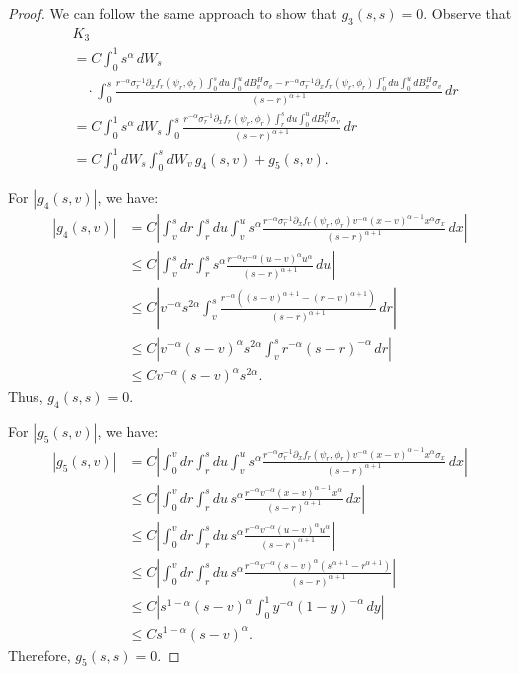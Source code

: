 \documentclass{article}
\theoremstyle{definition}  %
\theoremstyle{plain}  %
\begin{document}
\begin{proof}
We can follow the same approach to show that \( g_3(s, s) = 0 \). Observe that
\begin{align*}
    &K_3 \\
    &= C \int_0^1 s^\alpha \, dW_s\\
&\quad\cdot\int_0^s \frac{r^{-\alpha} \sigma_r^{-1} \partial_x f_r(\psi_r, \phi_r) \int_0^s du \int_0^u dB^H_v \sigma_v - r^{-\alpha} \sigma_r^{-1} \partial_x f_r(\psi_r, \phi_r) \int_0^r du \int_0^u dB^H_v \sigma_v}{(s - r)^{\alpha + 1}} \, dr \\
    &= C \int_0^1 s^\alpha \, dW_s \int_0^s \frac{r^{-\alpha} \sigma_r^{-1} \partial_x f_r(\psi_r, \phi_r) \int_r^s du \int_0^u dB^H_v \sigma_v}{(s - r)^{\alpha + 1}} \, dr \\
    &= C \int_0^1 dW_s \int_0^s dW_v \, g_4(s,v) + g_5(s,v).
\end{align*}

For \( |g_4(s,v)| \), we have:
\begin{align*}
    |g_4(s,v)| &= C \left| \int_v^s dr \int_r^s du \int_v^u s^\alpha \frac{r^{-\alpha} \sigma_r^{-1} \partial_x f_r(\psi_r, \phi_r) v^{-\alpha} (x - v)^{\alpha - 1} x^\alpha \sigma_x}{(s - r)^{\alpha + 1}} \, dx \right| \\
    &\leq C \left| \int_v^s dr \int_r^s s^\alpha \frac{r^{-\alpha} v^{-\alpha} (u - v)^{\alpha} u^\alpha}{(s - r)^{\alpha + 1}} \, du \right| \\
    &\leq C \left| v^{-\alpha} s^{2\alpha} \int_v^s \frac{r^{-\alpha} \left( (s - v)^{\alpha + 1} - (r - v)^{\alpha + 1} \right)}{(s - r)^{\alpha + 1}} \, dr \right| \\
    &\leq C \left| v^{-\alpha} (s - v)^{\alpha} s^{2\alpha} \int_v^s r^{-\alpha} (s - r)^{-\alpha} \, dr \right| \\
    &\leq C v^{-\alpha} (s - v)^\alpha s^{2\alpha}.
\end{align*}
Thus, \( g_4(s,s) = 0 \).

For \( |g_5(s,v)| \), we have:
\begin{align*}
    |g_5(s,v)| &= C \left| \int_0^v dr \int_r^s du \int_v^u s^\alpha \frac{r^{-\alpha} \sigma_r^{-1} \partial_x f_r(\psi_r, \phi_r) v^{-\alpha} (x - v)^{\alpha - 1} x^\alpha \sigma_x}{(s - r)^{\alpha + 1}} \, dx \right| \\
    &\leq C \left| \int_0^v dr \int_r^s du \, s^\alpha \frac{r^{-\alpha} v^{-\alpha} (x - v)^{\alpha - 1} x^\alpha}{(s - r)^{\alpha + 1}} \, dx \right| \\
    &\leq C \left| \int_0^v dr \int_r^s du \, s^\alpha \frac{r^{-\alpha} v^{-\alpha} (u - v)^\alpha u^\alpha}{(s - r)^{\alpha + 1}} \right| \\
    &\leq C \left| \int_0^v dr \int_r^s du \, s^\alpha \frac{r^{-\alpha} v^{-\alpha} (s - v)^\alpha (s^{\alpha + 1} - r^{\alpha + 1})}{(s - r)^{\alpha + 1}} \right| \\
    &\leq C \left| s^{1-\alpha} (s - v)^\alpha \int_0^1 y^{-\alpha} (1 - y)^{-\alpha} \, dy \right| \\
    &\leq C s^{1-\alpha} (s - v)^\alpha.
\end{align*}
Therefore, \( g_5(s,s) = 0 \).


\end{proof}
\end{document}
